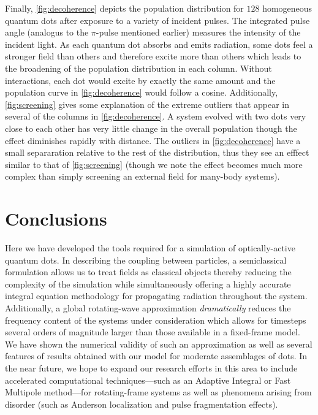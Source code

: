 \documentclass[conference]{IEEEtran}
\begin{document}
Finally, \cref{fig:decoherence} depicts the population distribution for $128$ homogeneous quantum dots after exposure to a variety of incident pulses.
The integrated pulse angle (analogus to the $\pi$-pulse mentioned earlier) measures the intensity of the incident light.
As each quantum dot absorbs and emits radiation, some dots feel a stronger field than others and therefore excite more than others which leads to the broadening of the population distribution in each column.
Without interactions, each dot would excite by exactly the same amount and the population curve in \cref{fig:decoherence} would follow a cosine.
Additionally, \cref{fig:screening} gives some explanation of the extreme outliers that appear in several of the columns in \cref{fig:decoherence}.
A system evolved with two dots very close to each other has very little change in the overall population though the effect diminishes rapidly with distance.
The outliers in \cref{fig:decoherence} have a small separaration relative to the rest of the distribution, thus they see an efffect similar to that of \cref{fig:screening} (though we note the effect becomes much more complex than simply screening an external field for many-body systems).


\section{Conclusions}
Here we have developed the tools required for a simulation of optically-active quantum dots.
In describing the coupling between particles, a semiclassical formulation allows us to treat fields as classical objects thereby reducing the complexity of the simulation while simultaneously offering a highly accurate integral equation methodology for propagating radiation throughout the system.
Additionally, a global rotating-wave approximation \emph{dramatically} reduces the frequency content of the systems under consideration which allows for timesteps several orders of magnitude larger than those available in a fixed-frame model.
We have shown the numerical validity of such an approximation as well as several features of results obtained with our model for moderate assemblages of dots.
In the near future, we hope to expand our research efforts in this area to include accelerated computational techniques---such as an Adaptive Integral\cite{Bleszynski1996} or Fast Multipole method\cite{Greengard1987}---for rotating-frame systems as well as phenomena arising from disorder (such as Anderson localization and pulse fragmentation effects).


{}

\end{document}
